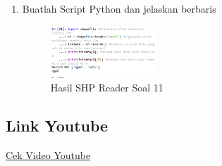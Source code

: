 \begin{enumerate}
    \item Buatlah Script Python dan jelaskan berbaris
    
    \hfill\break
    \begin{figure}[H]
		\includegraphics[width=4cm]{figures/1174096/3/soal11.png}
		\centering
		\caption{Hasil SHP Reader Soal 11}
    \end{figure}
\end{enumerate}
\subsection{Link Youtube}
\href{https://youtu.be/uXg9vByUoro}{Cek Video Youtube}